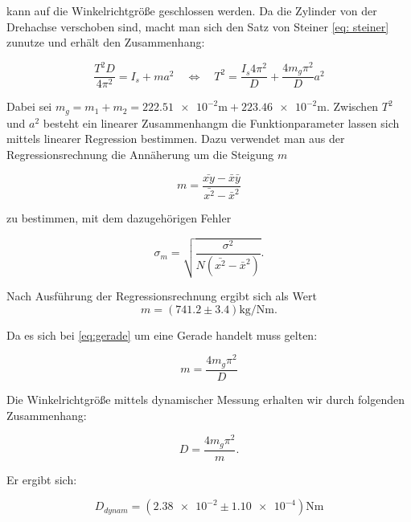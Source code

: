 kann auf die Winkelrichtgröße geschlossen werden.
Da die Zylinder von der Drehachse verschoben sind, macht man sich den
Satz von Steiner \eqref{eq: steiner} zunutze und erhält den Zusammenhang: %

\begin{equation}
\label{eq:gerade}
\frac{T^2D}{4\pi^2}=I_s+ma^2\quad \Leftrightarrow \quad T^2=\frac{I_s 4\pi^2}{D}+\frac{4m_g\pi^2}{D}a^2
\end{equation}

Dabei sei $m_g=m_1+m_2=\num{222.51e-2}\si{\meter}+\num{223.46e-2}\si{\meter}$.
Zwischen $T^2$ und $a^2$ besteht ein linearer Zusammenhangm
die Funktionparameter lassen sich mittels linearer Regression bestimmen. %
Dazu verwendet man aus der Regressionsrechnung
die Annäherung um die Steigung $m$

\begin{equation*}
m=\frac{\bar{xy}-\bar{x}\bar{y}}{\bar{x^2}-\bar{x}^2}
\end{equation*}

zu bestimmen, mit dem dazugehörigen Fehler

\begin{equation*}
\sigma_m=\sqrt{\frac{\sigma^2}{N(\bar{x^2}-\bar{x}^2)}}.
\end{equation*}

Nach Ausführung der Regressionsrechnung ergibt sich als Wert
\begin{equation}
\label{eq: steigung}
m=\left(\num{741.2}\pm\num{3.4}\right) \si{\kilogram\per\newton\meter}.
\end{equation}

Da es sich bei \eqref{eq:gerade} um eine Gerade handelt muss gelten:

\begin{equation*}
m=\frac{4m_g\pi^2}{D}
\end{equation*}

Die Winkelrichtgröße mittels dynamischer Messung erhalten wir durch folgenden 
Zusammenhang: %

\begin{equation*}
D=\frac{4m_g\pi^2}{m}.
\end{equation*}

Er ergibt sich:

\begin{equation}
\label{winkelrichtgroesse_dynamisch}
D_{dynam}=\left(\num{2.38e-2} \pm \num{1.10e-4}\right)\si{\newton\meter}
\end{equation}

